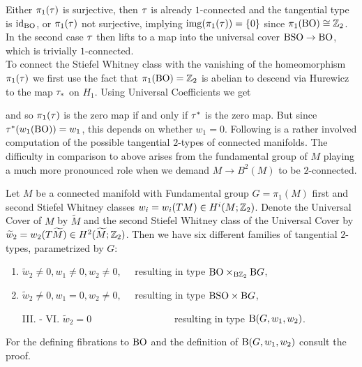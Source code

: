     Either $\pi_1(\tau)$ is surjective, then $\tau$ is already $1$-connected and the tangential type is $\operatorname{id}_{\mathrm{BO}}$, or $\pi_1(\tau)$ not surjective, implying $\operatorname{img}(\pi_1(\tau)) = \{0\}$ since $\pi_1(\mathrm{BO}) \cong \mathbb{Z}_2$. 
    In the second case $\tau$ then lifts to a map into the universal cover $\mathrm{BSO} \to \mathrm{BO}$, which is trivially $1$-connected.\\
    To connect the Stiefel Whitney class with the vanishing of the homeomorphism $\pi_1(\tau)$ we first use the fact that $\pi_1(\mathrm{BO})= \mathbb{Z}_2$ is abelian to descend via Hurewicz to the map $\tau_\ast$ on $H_1$.
    Using Universal Coefficients we get 
    \begin{center}
    \end{center}
    and so $\pi_1(\tau)$ is the zero map if and only if $\tau^\ast$ is the zero map. But since $\tau^\ast(w_1(\mathrm{BO})) = w_1$, this depends on whether $w_1 = 0$.
\endprf
Following is a rather involved computation of the possible tangential $2$-types of connected manifolds. 
The difficulty in comparison to above arises from the fundamental group of $M$ playing a much more pronounced role when we demand $M\to B^2(M)$ to be $2$-connected.
\begin{thesisprop}\label{tttypes}
    Let $M$ be a connected manifold with Fundamental group $G = \pi_1(M)$ first and second Stiefel Whitney classes $w_i = w_i(TM) \in H^i(M;\mathbb{Z}_2)$. 
    Denote the Universal Cover of $M$ by $\widetilde{M}$ and the second Stiefel Whitney class of the Universal Cover by $\widetilde{w}_2 = w_2(T\widetilde{M}) \in H^2(\widetilde{M};\mathbb{Z}_2)$.
    Then we have six different families of tangential $2$-types, parametrized by $G$:
    \begin{enumerate}[noitemsep, label=\Roman*., labelindent=3cm, labelwidth=!]
        \item $ \widetilde{w}_2 \neq 0, w_1 \neq 0, w_2 \neq 0,\quad$ resulting in type $\mathrm{BO} \times_{\mathrm{B} \mathbb{Z}_2} \mathrm{B} G$,
        \item $ \widetilde{w}_2 \neq 0, w_1 = 0, w_2 \neq 0,\quad$ resulting in type $\mathrm{BSO} \times \mathrm{B} G$,
        \item[III. - VI.] $\widetilde{w}_2 = 0\quad\quad\quad\quad\quad\quad\quad\quad\,$ resulting in type $\mathrm{B}(G,w_1,w_2)$.
    \end{enumerate}
    For the defining fibrations to $\mathrm{BO}$ and the definition of $\mathrm{B}(G,w_1,w_2)$ consult the proof.
\end{thesisprop}
